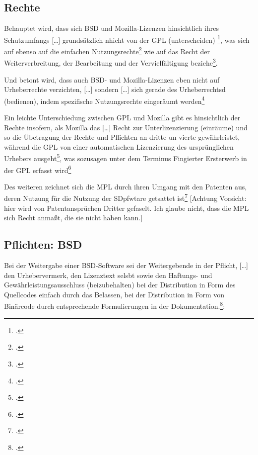 \documentclass[DIV=calc,BCOR=5mm,11pt,headings=small,oneside,abstract=true, toc=bib]{scrartcl}
\begin{document}
\subsection{Rechte}

Behauptet wird, dass sich BSD und Mozilla-Lizenzen \glqq{}hinsichtlich
ihres Schutzumfangs [\ldots] grundsätzlich nhicht von der GPL (unterscheiden)
\grqq{}\footcite[vgl.][323]{ArlBriVol2004a}, was sich auf ebenso auf die
\glqq{}einfachen Nutzungsrechte\grqq{}\footcite[vgl.][324]{ArlBriVol2004a} wie
auf das Recht der \glqq{}Weiterverbreitung\grqq{}, der \glqq{}Bearbeitung\grqq{}
und der \glqq{}Vervielfältigung\grqq{}
beziehe\footcite[vgl.][325]{ArlBriVol2004a}.

Und betont wird, dass auch BSD- und Mozilla-Lizenzen eben nicht auf
Urheberrechte verzichten, \glqq{}[\ldots] sondern [\ldots] sich gerade
des Urheberrechtsd (bedienen), indem spezifische Nutzungsrechte
eingeräumt werden\grqq{}\footcite[vgl.][324]{ArlBriVol2004a}

Ein leichte Unterschiedung zwischen GPL und Mozilla gibt es hinsichtlich der
Rechte insofern, als Mozilla das \glqq{}[\ldots] Recht zur
Unterlizenzierung (einräume)\grqq{} und so die Übetragung der Rechte und
Pflichten an dritte un vierte gewährleistet, während die GPL von einer
automatischen Lizenzierung des ursprünglichen Urhebers
ausgeht\footcite[vgl.][329]{ArlBriVol2004a}, was sozusagen unter dem Terminus
\glqq{}Fingierter Ersterwerb in der GPL\grqq{} erfasst
wird\footcite[vgl.][331]{ArlBriVol2004a}

Des weiteren zeichnet sich die MPL durch ihren Umgang mit den Patenten aus,
deren Nutzung für die Nutzung der SDpfwtare getsattet
ist\footcite[vgl.][330]{ArlBriVol2004a}  [Achtung Vorsicht: hier wird von
\glqq{}Patentansprüchen Dritter\grqq{} gefaselt. Ich glaube nicht, dass die MPL
sich Recht anmaßt, die sie nicht haben kann.]


\subsection{Pflichten: BSD}

Bei der Weitergabe einer BSD-Software sei der Weitergebende in der Pflicht,
\glqq{}[\ldots] den Urhebervermerk, den Lizenztext selsbt sowie den
Haftungs- und Gewährleistungsausschluss
(beizubehalten)\grqq{} bei der
Distribution in Form des Quellcodes einfach durch das Belassen, bei der
Distribution in Form von Binärcode durch entsprechende Formulierungen in der
Dokumentation.\footcite[vgl.][343]{ArlBriVol2004a}:
\end{document}
